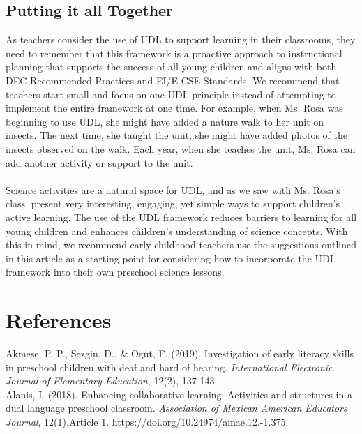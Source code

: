 \documentclass[11.5pt]{sig-alternate}
\begin{document}
\begin{large}
\section*{Putting it all Together}
As teachers consider the use of UDL to support learning in their classrooms, they need to remember that this framework is a proactive approach to instructional planning that supports the success of all young children and aligns with both DEC Recommended Practices and EI/E-CSE Standards. We recommend that teachers start small and focus on one UDL principle instead of attempting to implement the entire framework at one time. For example, when Ms. Rosa was beginning to use UDL, she might have added a nature walk to her unit on insects. The next time, she taught the unit, she might have added photos of the insects observed on the walk. Each year, when she teaches the unit, Ms. Rosa can add another activity or support to the unit. \\\\
\newpage
Science activities are a natural space for UDL, and as we saw with Ms. Rosa’s class, present very interesting, engaging, yet simple ways to support children’s active learning. The use of the UDL framework reduces barriers to learning for all young children and enhances children’s understanding of science concepts. With this in mind, we recommend early childhood teachers use the suggestions outlined in this article as a starting point for considering how to incorporate the UDL framework into their own preschool science lessons.
\end{large}


\section*{References}\par 

\leftskip 0.25in
\parindent -0.25in 

Akmese, P. P., Sezgin, D., \& Ogut, F. (2019). Investigation of early literacy skills in preschool 
children with deaf and hard of hearing. \textit{International Electronic Journal of Elementary Education}, 12(2), 137-143. 
\\

Alanis, I. (2018). Enhancing collaborative learning: Activities and structures in a dual language 
preschool classroom. \textit{Association of Mexican American Educators Journal}, 12(1),Article 1. https://doi.org/10.24974/amae.12.-1.375. 
\\
\end{document}
